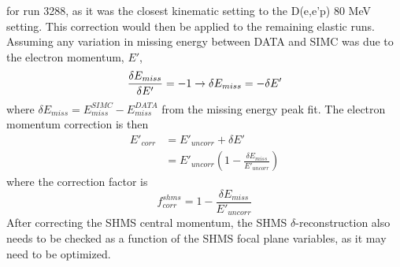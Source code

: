 \documentclass[11pt]{article}
\begin{document}
for run 3288, as it was the closest kinematic setting to the D(e,e'p) 80 MeV setting. This correction would then
be applied to the remaining elastic runs. \\
\indent Assuming any variation in missing energy between DATA and SIMC was due to the electron momentum, $E'$,
\begin{equation}
  \frac{\delta E_{miss}}{\delta E'} = -1 \rightarrow \delta E_{miss} = -\delta E' \\
\end{equation}
where $\delta E_{miss} = E^{SIMC}_{miss} - E^{DATA}_{miss}$ from the missing energy peak fit.
The electron momentum correction is then
\begin{align}
  E'_{corr} & =  E'_{uncorr} + \delta E' \nonumber \\
  & = E'_{uncorr}(1 - \frac{\delta E_{miss}}{E'_{uncorr}})
\end{align}
where the correction factor is
\begin{equation}
f^{shms}_{corr} = 1 - \frac{\delta E_{miss}}{E'_{uncorr}}
\end{equation}
After correcting the SHMS central momentum, the SHMS $\delta$-reconstruction also needs to be checked as a function
of the SHMS focal plane variables, as it may need to be optimized.
\end{document}
